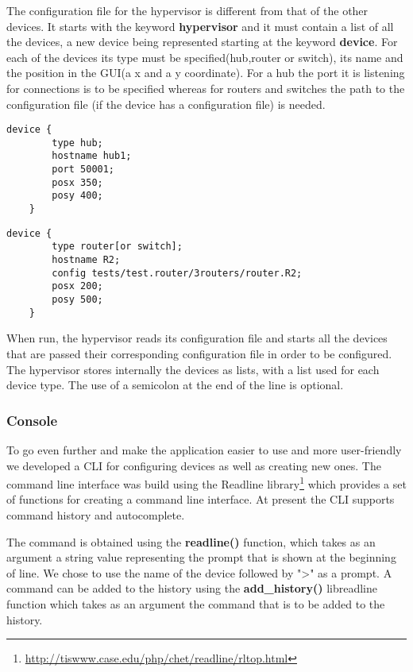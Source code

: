 {{The configuration file for the hypervisor is different from that of the other devices. It starts with the 
keyword \textbf{hypervisor} and it must contain a list of all the devices, a new device being represented starting at the 
keyword \textbf{device}. For each of the devices its type must be specified(hub,router or switch), its 
name and the position in the GUI(a x and a y coordinate). For a hub the port it is listening for connections is 
to be specified whereas for routers and switches the path to the configuration file (if the device has a configuration file) is needed.    
\lstset{language=zsh,caption=Listing a Hub in hypervisor configuration file,label=lst:hy-config-file}
\begin{lstlisting}
device {
		type hub;
		hostname hub1;
		port 50001;
		posx 350;
		posy 400;
	}
\end{lstlisting}
\lstset{language=TeX,caption=Listing a Router/Switch in hypervisor configuration file,label=lst:hy-config-file}
\begin{lstlisting}
device {
		type router[or switch];
		hostname R2;
		config tests/test.router/3routers/router.R2;
		posx 200;
		posy 500;
	}
\end{lstlisting}
When run, the hypervisor reads its configuration file and starts all the devices that are passed their corresponding configuration file in order to be configured.
The hypervisor stores internally the devices as lists, with a list used for each device type. 
The use of a semicolon at the end of the line is optional.  
\subsubsection{Console}
\label{subsubsec:impl-console}
To go even further and make the application easier to use and more user-friendly we developed a CLI for configuring 
devices as well as creating new ones. The command line interface was build using the Readline 
library\footnote{\url{http://tiswww.case.edu/php/chet/readline/rltop.html}} which provides a set of 
functions for creating a command line interface. At present the CLI supports command history and autocomplete. 

The command is obtained using the \textbf{readline()} function, which takes as an argument a string value 
representing the prompt that is shown at the beginning of line. We chose to use the name of the device followed 
by ">" as a prompt. A command can be added to the history using the \textbf{add_history()} libreadline function 
which takes as an argument the command that is to be added to the history.

}}
